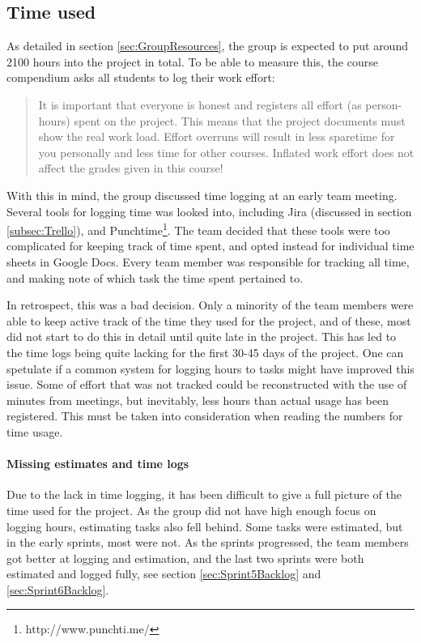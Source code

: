 \documentclass[11pt,a4paper,titlepage,oneside]{report}
\begin{document}
\subsection{Time used}
\label{subsec:TimeUsed}
As detailed in section \ref{sec:GroupResources}, the group is expected to put around 2100 hours into the project in total. To be able to measure this, the \gls{course compendium} asks all students to log their work effort:

\begin{quote}
It is important that everyone is honest and registers all effort (as person-hours) spent on the project. This means that the project documents must show the real work load. Effort overruns will result in less sparetime for you personally and less time for other courses. Inflated work effort does not affect the grades given in this course! \cite{TDT4290:Intro}
\end{quote}

With this in mind, the group discussed time logging at an early team meeting. Several tools for logging time was looked into, including Jira (discussed in section \ref{subsec:Trello}), and Punchtime\footnote{http://www.punchti.me/}. The team decided that these tools were too complicated for keeping track of time spent, and opted instead for individual time sheets in Google Docs. Every team member was responsible for tracking all time, and making note of which task the time spent pertained to. 

In retrospect, this was a bad decision. Only a minority of the team members were able to keep active track of the time they used for the project, and of these, most did not start to do this in detail until quite late in the project. This has led to the time logs being quite lacking for the first 30-45 days of the project. One can spetulate if a common system for logging hours to tasks might have improved this issue. Some of effort that was not tracked could be reconstructed with the use of minutes from meetings, but inevitably, less hours than actual usage has been registered. This must be taken into consideration when reading the numbers for time usage.  

\paragraph{Missing estimates and time logs}
Due to the lack in time logging, it has been difficult to give a full picture of the time used for the project. As the group did not have high enough focus on logging hours, estimating tasks also fell behind. Some tasks were estimated, but in the early sprints, most were not. As the sprints progressed, the team members got better at logging and estimation, and the last two sprints were both estimated and logged fully, see section \ref{sec:Sprint5Backlog} and \ref{sec:Sprint6Backlog}.
\end{document}
